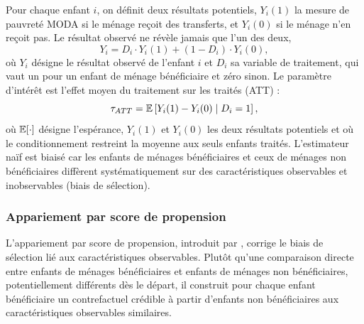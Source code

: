 Pour chaque enfant $i$, on définit deux résultats potentiels, $Y_i(1)$ la
mesure de pauvreté MODA si le ménage reçoit des transferts, et
$Y_i(0)$ si le ménage n'en reçoit pas. Le résultat observé ne révèle
jamais que l'un des deux,
\begin{equation}
  Y_i = D_i \cdot Y_i(1) + (1 - D_i) \cdot Y_i(0),
  \label{eq:observe}
\end{equation}
où $Y_i$ désigne le résultat observé de l'enfant $i$ et $D_i$ sa variable
de traitement, qui vaut un pour un enfant de ménage bénéficiaire et zéro
sinon. Le paramètre d'intérêt est l'effet moyen
du traitement sur les traités (ATT) :
\begin{equation}
  \tau_{ATT} = \mathbb{E}\left[Y_i(1) - Y_i(0) \mid D_i = 1\right],
  \label{eq:att}
\end{equation}
où $\mathbb{E}[\cdot]$ désigne l'espérance, $Y_i(1)$ et $Y_i(0)$ les deux
résultats potentiels et où le conditionnement restreint la moyenne aux
seuls enfants traités. L'estimateur naïf est biaisé car les enfants de ménages bénéficiaires et ceux
de ménages non bénéficiaires diffèrent systématiquement sur des
caractéristiques observables et inobservables (biais de sélection).

\subsubsection{Appariement par score de propension}

L'appariement par score de propension, introduit par \textcite{rosenbaum1983},
corrige le biais de sélection lié aux caractéristiques observables. Plutôt qu'une comparaison directe entre enfants de
ménages bénéficiaires et enfants de ménages non bénéficiaires, potentiellement
différents dès le départ, il construit pour chaque enfant bénéficiaire un
contrefactuel crédible à partir d'enfants non bénéficiaires aux
caractéristiques observables similaires.

